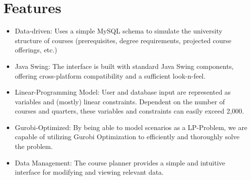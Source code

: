 \documentclass[a4paper,12pt]{article}
\begin{document}
\section{Features}
\begin{itemize}
\item Data-driven: Uses a simple MySQL schema to simulate the university structure of courses (prerequisites, degree requirements, projected course offerings, etc.)
\item Java Swing: The interface is built with standard Java Swing components, offering cross-platform compatibility and a sufficient look-n-feel.
\item Linear-Programming Model: User and database input are represented as variables and (mostly) linear constraints. Dependent on the number of courses and quarters, these variables and constraints can easily exceed 2,000.
\item Gurobi-Optimized: By being able to model scenarios as a LP-Problem, we are capable of utilizing Gurobi Optimization to efficiently and thoroughly solve the problem.
\item Data Management: The course planner provides a simple and intuitive interface for modifying and viewing relevant data.
\end{itemize}
\end{document}
